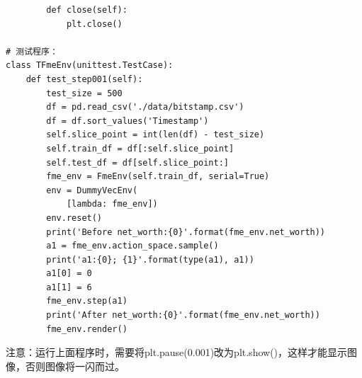 \documentclass{article}
\begin{document}
\begin{lstlisting}
        def close(self):
            plt.close()

# 测试程序：
class TFmeEnv(unittest.TestCase):
    def test_step001(self):
        test_size = 500
        df = pd.read_csv('./data/bitstamp.csv')
        df = df.sort_values('Timestamp')
        self.slice_point = int(len(df) - test_size)
        self.train_df = df[:self.slice_point]
        self.test_df = df[self.slice_point:]
        fme_env = FmeEnv(self.train_df, serial=True)
        env = DummyVecEnv(
            [lambda: fme_env])
        env.reset()
        print('Before net_worth:{0}'.format(fme_env.net_worth))
        a1 = fme_env.action_space.sample()
        print('a1:{0}; {1}'.format(type(a1), a1))
        a1[0] = 0
        a1[1] = 6
        fme_env.step(a1)
        print('After net_worth:{0}'.format(fme_env.net_worth))
        fme_env.render()
\end{lstlisting}
注意：运行上面程序时，需要将plt.pause(0.001)改为plt.show()，这样才能显示图像，否则图像将一闪而过。
\end{document}
